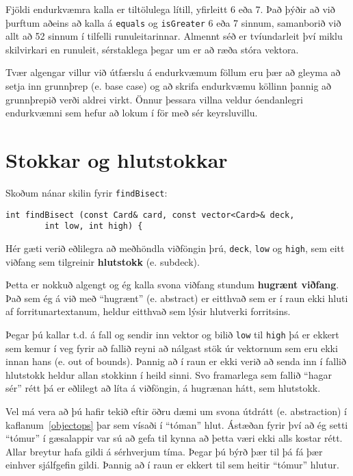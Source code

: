 Fjöldi endurkvæmra kalla er tiltölulega lítill, yfirleitt 6 eða 7.
Það þýðir að við þurftum aðeins að kalla á {\tt equals} og {\tt isGreater} 6 eða 7 sinnum, 
samanborið við allt að 52 sinnum í tilfelli runuleitarinnar.
Almennt séð er tvíundarleit því miklu skilvirkari en runuleit, sérstaklega þegar um er að ræða stóra vektora.

Tvær algengar villur við útfærslu á endurkvæmum föllum eru þær að gleyma að setja inn grunnþrep (e. base case)
og að skrifa endurkvæmu köllinn þannig að grunnþrepið verði aldrei virkt.
Önnur þessara villna veldur óendanlegri endurkvæmni sem hefur að lokum í för með sér keyrsluvillu.


\section{Stokkar og hlutstokkar}

Skoðum nánar skilin fyrir {\tt findBisect}:

\begin{verbatim}
int findBisect (const Card& card, const vector<Card>& deck,
		int low, int high) {
\end{verbatim}
%
Hér gæti verið eðlilegra að meðhöndla viðföngin þrú, {\tt deck}, {\tt low} og {\tt high},
sem eitt viðfang sem tilgreinir {\bf hlutstokk} (e. subdeck).


Þetta er nokkuð algengt og ég kalla svona viðfang stundum {\bf hugrænt viðfang}.
Það sem ég á við með ``hugrænt'' (e. abstract) er eitthvað sem er í raun ekki hluti af forritunartextanum, 
heldur eitthvað sem lýsir hlutverki forritsins.

Þegar þú kallar t.d. á fall og sendir inn vektor og bilið {\tt low} til {\tt high}
þá er ekkert sem kemur í veg fyrir að fallið reyni að nálgast stök úr vektornum sem eru
ekki innan hans (e. out of bounds). 
Þannig að í raun er ekki verið að senda inn í fallið hlutstokk heldur allan stokkinn í heild sinni.
Svo framarlega sem fallið ``hagar sér'' rétt þá er eðlilegt að líta á viðföngin, á hugrænan hátt, sem hlutstokk.

Vel má vera að þú hafir tekið eftir öðru dæmi um svona útdrátt (e. abstraction) í kaflanum~\ref{objectops}
þar sem vísaði í ``tóman'' hlut.
Ástæðan fyrir því að ég setti ``tómur'' í gæsalappir var sú að gefa til kynna að þetta væri ekki alls kostar rétt.
Allar breytur hafa gildi á sérhverjum tíma.
Þegar þú býrð þær til þá fá þær einhver sjálfgefin gildi.
Þannig að í raun er ekkert til sem heitir ``tómur'' hlutur.

